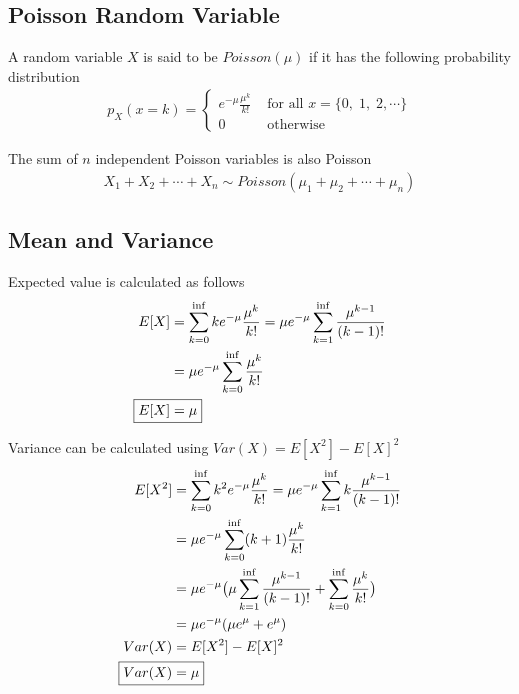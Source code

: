 \documentclass[../probability-notes.tex]{subfiles}
\begin{document}
    \subsection{Poisson Random Variable}
    A random variable $X$ is said to be $Poisson(\mu)$ if it has the following probability distribution
    \begin{align*}
        p_{X}(x = k) = \begin{cases} e^{-\mu} \frac{\mu^{k}}{k!} &\text{ for all } x = \{ 0,\;1,\;2, \cdots \}\\
                                    0 &\text{ otherwise} \end{cases}
    \end{align*}

    The sum of $n$ independent Poisson variables is also Poisson
    \begin{align*}
        X_{1} + X_{2} + \cdots + X_{n} \sim Poisson(\mu_{1} + \mu_{2} + \cdots + \mu_{n})
    \end{align*}

    \subsection{Mean and Variance}
    Expected value is calculated as follows
    \begin{align*}
        E[X] &= \sum_{k=0}^{\inf} ke^{-\mu} \frac{\mu^{k}}{k!} = \mu e^{-\mu} \sum_{k=1}^{\inf} \frac{\mu^{k-1}}{(k-1)!}\\
        &= \mu e^{-\mu} \sum_{k=0}^{\inf} \frac{\mu^{k}}{k!}\\
        \Aboxed{E[X] &= \mu}
    \end{align*}

    Variance can be calculated using $Var(X) = E[X^{2}] - E[X]^{2}$
    \begin{align*}
        E[X^{2}] &= \sum_{k=0}^{\inf} k^{2} e^{-\mu} \frac{\mu^{k}}{k!} = \mu e^{-\mu} \sum_{k=1}^{\inf} k\frac{\mu^{k-1}}{(k-1)!}\\
        &= \mu e^{-\mu} \sum_{k=0}^{\inf} (k+1) \frac{\mu^{k}}{k!}\\
        &= \mu e^{-\mu} \big( \mu \sum_{k=1}^{\inf} \frac{\mu^{k-1}}{(k-1)!} + \sum_{k=0}^{\inf} \frac{\mu^{k}}{k!} \big)\\
        &= \mu e^{-\mu} (\mu e^{\mu} + e^{\mu})\\
        Var(X) &= E[X^{2}] - E[X]^{2}\\
        \Aboxed{Var(X) &= \mu}
    \end{align*}
\end{document}
